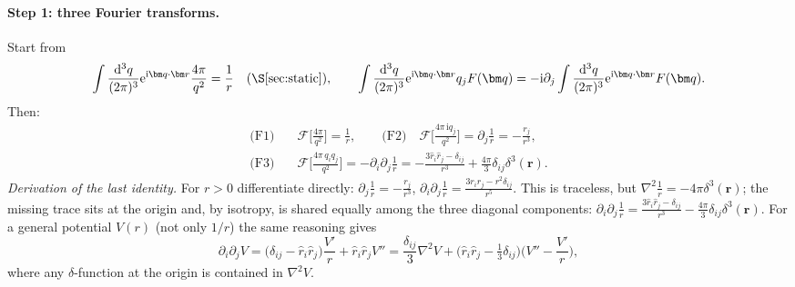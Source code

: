 \documentclass[11pt,a4paper]{article}
\numberwithin{equation}{section}
\theoremstyle{definition}
\theoremstyle{plain}
\theoremstyle{remark}
\numberwithin{algorithm}{section}
\newcommand{\vr}{\bm r}
\newcommand{\vq}{\bm q}
\newcommand{\dd}{\mathrm{d}}
\newcommand{\ii}{\mathrm{i}}
\newcommand{\ee}{\mathrm{e}}
\begin{document}
\paragraph{Step 1: three Fourier transforms.} Start from
\[
\int\frac{\dd^3q}{(2\pi)^3}\ee^{\ii\vq\cdot\vr}\frac{4\pi}{q^2}=\frac1r\quad(\S\ref{sec:static}),\qquad
\int\frac{\dd^3q}{(2\pi)^3}\ee^{\ii\vq\cdot\vr}q_jF(\vq)=-\ii\partial_j\int\frac{\dd^3q}{(2\pi)^3}\ee^{\ii\vq\cdot\vr}F(\vq).
\]
Then:
\begin{align}
\text{(F1)}\quad&\mathcal F\Big[\frac{4\pi}{q^2}\Big]=\frac1r,\qquad
\text{(F2)}\quad\mathcal F\Big[\frac{4\pi\,\ii q_j}{q^2}\Big]=\partial_j\frac1r=-\frac{r_j}{r^3},\nonumber\\
\text{(F3)}\quad&\mathcal F\Big[\frac{4\pi\,q_iq_j}{q^2}\Big]=-\partial_i\partial_j\frac1r=-\frac{3\hat r_i\hat r_j-\delta_{ij}}{r^3}+\frac{4\pi}{3}\delta_{ij}\delta^3(\vr).
\label{eq:F123}
\end{align}
\emph{Derivation of the last identity.} For $r>0$ differentiate directly: $\partial_j\frac1r=-\frac{r_j}{r^3}$, $\partial_i\partial_j\frac1r=\frac{3r_ir_j-r^2\delta_{ij}}{r^5}$. This is traceless, but $\nabla^2\frac1r=-4\pi\delta^3(\vr)$; the missing trace sits at the origin and, by isotropy, is shared equally among the three diagonal components: $\partial_i\partial_j\frac1r=\frac{3\hat r_i\hat r_j-\delta_{ij}}{r^3}-\frac{4\pi}3\delta_{ij}\delta^3(\vr)$. For a general potential $V(r)$ (not only $1/r$) the same reasoning gives
\begin{equation}
\partial_i\partial_jV=\Big(\delta_{ij}-\hat r_i\hat r_j\Big)\frac{V'}{r}+\hat r_i\hat r_jV''
=\frac{\delta_{ij}}3\nabla^2V+\Big(\hat r_i\hat r_j-\tfrac13\delta_{ij}\Big)\Big(V''-\frac{V'}r\Big),
\label{eq:dijV}
\end{equation}
where any $\delta$-function at the origin is contained in $\nabla^2V$.
\end{document}
